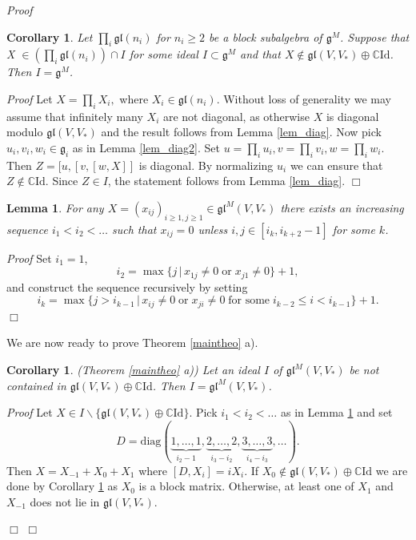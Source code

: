 \documentclass{svmult}
\newtheorem{lem}[theo]{Lemma}
\newtheorem{cor}[theo]{Corollary}
\renewenvironment{proof}{ \emph{Proof}}{$\Box$}
\newcommand {\CC} {\mathbb {C}}
\newcommand{\oj}{\mathfrak{g}}
\newcommand{\ojl}{\mathfrak{gl}}
\newcommand{\id}{\mathrm{Id}}
\renewcommand{\gg}{\mathfrak{g}}
\newcommand{\gl}{\mathfrak{gl}}
\begin{document}
\begin{proof}
\begin{cor}\label{cor_1} Let $\prod_{i} \gl(n_i)$ for $n_i \geq 2$ be a block subalgebra of $\gg^M$. 
Suppose that X $\in \left(\prod_{i} \gl(n_i)\right) \cap I$ for some ideal $I \subset \gg^M$ and that $X \notin \gl(V,V_*) \oplus \CC \mathrm{Id}$. Then $I = \gg^M$.
\end{cor}
\begin{proof}
 Let $X = \prod_i X_i,$ where $X_i \in \gl(n_i)$. Without loss of generality we may assume that infinitely many $X_i$ are not diagonal, as otherwise $X$ is diagonal modulo $\gl(V,V_*)$ and the result follows from Lemma \ref{lem_diag}. Now pick $u_i,v_i,w_i \in \oj_i$ as in Lemma \ref{lem_diag2}. Set $u = \prod_i u_i, v=\prod_i v_i, w=\prod_i w_i$. Then $Z=[u,[v,[w,X]]$ is diagonal. By normalizing $u_i$ we can ensure that $Z \notin \CC \id$. Since $Z \in I$, the statement follows from Lemma \ref{lem_diag}.
\end{proof}

\begin{lem}\label{lem_4} 
For any $X = (x_{ij})_{i\geq1,j\geq1}\in \gl^M(V,V_*)$ there exists an increasing sequence $i_1<i_2<\dots$ such that 
$x_{ij}=0$ unless $i,j \in \left[i_k,i_{k+2}-1\right]$ for some $k$. 
\end{lem}


\begin{proof} Set $i_1 =1$,
 \begin{equation}
  i_2 = \max\lbrace j\,|\, x_{1j}\neq0\; \mbox{or}\; x_{j1}\neq0\rbrace+1, \nonumber 
 \end{equation}
and construct the sequence recursively by setting 
\begin{equation}
 i_k = \max \lbrace j > i_{k-1}\,|\, x_{ij} \neq0\; \mbox{or}\; x_{ji} \neq0 \;\mbox{for some}\; i_{k-2} \leq i < i_{k-1}\rbrace +1.\nonumber
\end{equation}
\end{proof}

We are now ready to prove Theorem \ref{maintheo} a).

\begin{cor}\label{cor_2}(Theorem \ref{maintheo} a))  
Let an ideal $I$ of $ \gl^{M}(V,V_*)$ be not contained in $\gl (V,V_*) \oplus \CC \id$. Then $I=\gl^M(V,V_*)$.
\end{cor}

\begin{proof}
 Let $X \in I \backslash \lbrace\ojl(V,V_*) \oplus \CC \mathrm{Id}\rbrace$. Pick $i_1 < i_2 < \dots$ as in Lemma \ref{lem_4} and set 
\begin{equation}
 D = \mathrm{diag} (\underbrace{1, \dots, 1}_{i_2-1}, \underbrace{2, \dots ,2}_{i_3-i_2}, \underbrace{3, \dots, 3}_{i_4-i_3}, \dots). \nonumber
\end{equation}
 Then $X=X_{-1}+X_0+X_1$ where $[D,X_i]=iX_i$. If $X_0 \notin \ojl(V,V_*) \oplus \CC \id$ we are done by Corollary \ref{cor_1} as $X_0$ is a block matrix. Otherwise, at least one of $X_1$ and $X_{-1}$ does not lie in $\ojl(V,V_*)$.


\end{proof}
\end{proof}
\end{document}
